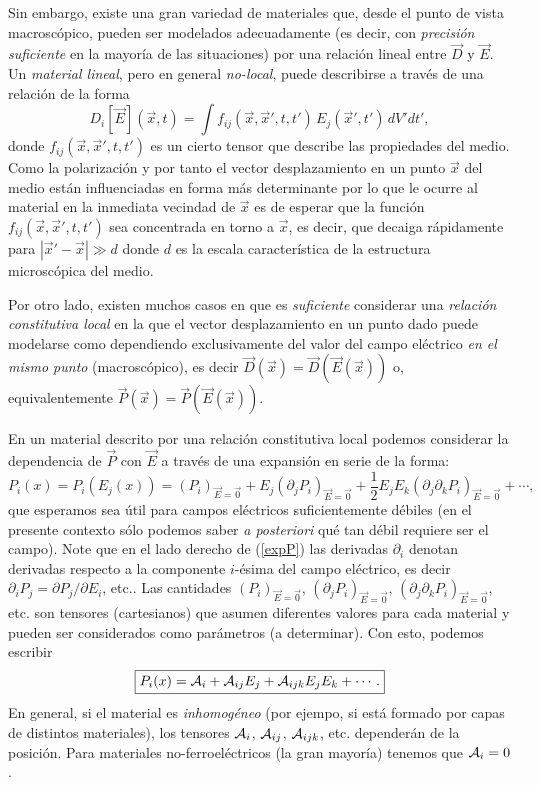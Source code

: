 Sin embargo, existe una gran variedad de materiales que, desde el punto de
vista macroscópico, pueden ser modelados adecuadamente (es decir, con \textit{precisión suficiente} en la mayoría de las situaciones) por una relación lineal entre $\vec{D}$ y $\vec{E}$. Un \textit{material lineal}, pero en general \textit{no-local}, puede describirse a
través de una relación de la forma
\begin{equation}
D_i[\vec{E}](\vec{x},t)=\int
f_{ij}(\vec{x},\vec{x}',t,t')\,{E}_j(\vec{x}',t')\,dV' dt',
\end{equation}
donde $f_{ij}(\vec{x},\vec{x}',t,t')$ es un cierto tensor que describe las
propiedades del medio. Como la polarización y por tanto el vector
desplazamiento en un punto $\vec{x}$ del medio están influenciadas en forma
más determinante por lo que le ocurre al material en la inmediata vecindad de
$\vec{x}$ es de esperar que la función $f_{ij}(\vec{x},\vec{x}',t,t')$ sea
concentrada en torno a $\vec{x}$, es decir, que decaiga rápidamente para
$|\vec{x}'-\vec{x}|\gg d$ donde $d$ es la escala característica de la
estructura microscópica del medio.

Por otro lado, existen muchos casos en que es \textit{suficiente} considerar una
\textit{relación constitutiva local} en la que el vector desplazamiento en un
punto dado puede modelarse como dependiendo exclusivamente del valor del campo
eléctrico \textit{en el mismo punto} (macroscópico), es decir
$\vec{D}(\vec{x})=\vec{D}(\vec{E}(\vec{x}))$ o, equivalentemente
$\vec{P}(\vec{x})=\vec{P}(\vec{E}(\vec{x}))$.

En un material descrito por una relación constitutiva local podemos considerar
la dependencia de $\vec{P}$ con $\vec{E}$ a través de una expansión en serie
de la forma:
\begin{equation}\label{expP}
P_i(x)=P_i(E_j(x))=(P_i)_{\vec{E}=\vec{0}}
+E_j(\partial_jP_i)_{\vec{E}=\vec{0}}+\frac{1}{2}
E_jE_k(\partial_j\partial_k P_i)_{\vec{E}=\vec{0}}+\cdots,
\end{equation}
que esperamos sea útil para campos eléctricos suficientemente débiles (en el
presente contexto sólo podemos saber \textit{a posteriori} qué tan débil
requiere ser el campo). Note que en el lado derecho de (\ref{expP}) las derivadas $\partial_i$ denotan derivadas respecto a la componente $i$-ésima del campo eléctrico, es decir $\partial_iP_j={\partial P_j}/{\partial E_i}$, etc.. Las cantidades $(P_i)_{\vec{E}=\vec{0}}$,
$(\partial_jP_i)_{\vec{E}=\vec{0}}$,
$(\partial_j\partial_k P_i)_{\vec{E}=\vec{0}}$, etc. son
tensores (cartesianos) que asumen diferentes valores para cada material y pueden ser
considerados como parámetros (a determinar). Con esto, podemos escribir
\begin{equation}
\boxed{P_i(x)={\cal A}_i+{\cal A}_{ij}E_j+{\cal A}_{ijk}
E_jE_k+\cdots.}
\end{equation}
En general, si el material es \textit{inhomogéneo} (por ejempo, si está formado por
capas de distintos materiales), los tensores ${\cal A}_i$, ${\cal A}_{ij}$, ${\cal A}_{ijk}$, etc. dependerán de la posición. Para materiales no-ferroeléctricos (la gran mayoría) tenemos que ${\cal A}_i=0$.



